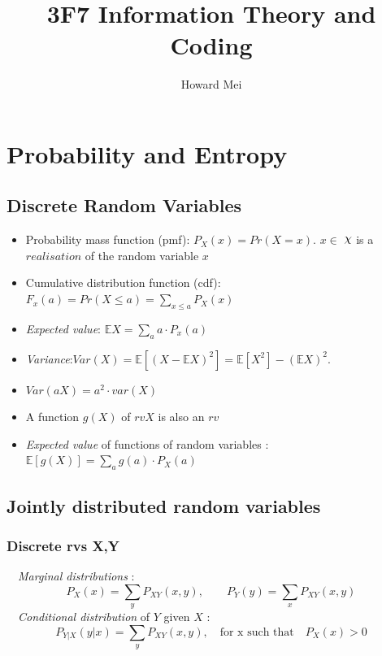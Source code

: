 \documentclass[24pt]{article}
\title{3F7 Information Theory and Coding}
\author{Howard Mei}
\DeclareRobustCommand{\rchi}{{\mathpalette\irchi\relax}}
\newcommand{\irchi}[2]{\raisebox{\depth}{$#1\chi$}} %
\begin{document}
  \maketitle
\section{Probability and Entropy}

\subsection{Discrete Random Variables}
\begin{itemize}

\item Probability mass function (pmf): $P_X(x)=Pr(X=x)$. $x \in$ $\rchi $ is a $realisation$ of the random variable $x$

\item Cumulative distribution function (cdf): $F_x(a)= Pr(X \le a) = \sum_{x\le a} P_X(x)$

\item \textit{Expected value}: $\mathbb{E}X = \sum_a a\cdot P_x(a)$

\item \textit{Variance}:$Var(X) = \mathbb{E}[(X - \mathbb{E}X)^2] = \mathbb{E}[X^2] - (\mathbb{E}X)^2.$

\item $Var(aX) = a^2 \cdot var(X)$

\item A function $g(X)$ of $rv X$ is also an $rv$

\item \textit{Expected value} of functions of random variables : $\mathbb{E}[g(X)] = \sum_a g(a)\cdot P_X(a)$

\end{itemize}

\subsection{Jointly distributed random variables}
\subsubsection{Discrete rvs X,Y}
\quad \ \, \textit{Marginal distributions} :
$$ P_X(x) = \sum_y P_{XY}(x,y), \qquad  P_Y(y) = \sum_x P_{XY}(x,y) $$ 
\quad \ \, \textit{Conditional distribution} of $Y$ given $X$ :
$$ P_{Y|X}(y|x) = \sum_y P_{XY}(x,y), \quad  \textrm{for x such that} \quad P_X(x) > 0$$ 
\end{document}
